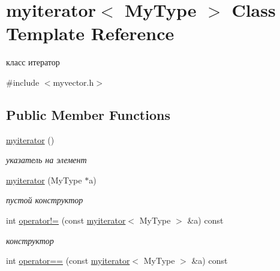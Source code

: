 \hypertarget{classmyiterator}{}\section{myiterator$<$ My\+Type $>$ Class Template Reference}
\label{classmyiterator}


класс итератор  




{\ttfamily \#include $<$myvector.\+h$>$}

\subsection*{Public Member Functions}
\begin{DoxyCompactItemize}
\item 
\hypertarget{classmyiterator_ad6723e5362bafc8d98815f59f75733f2}{}\hyperlink{classmyiterator_ad6723e5362bafc8d98815f59f75733f2}{myiterator} ()\label{classmyiterator_ad6723e5362bafc8d98815f59f75733f2}

\begin{DoxyCompactList}\small\item\em указатель на элемент \end{DoxyCompactList}\item 
\hypertarget{classmyiterator_a3c95cfeb2b52fba44ca58b151ec7a04a}{}\hyperlink{classmyiterator_a3c95cfeb2b52fba44ca58b151ec7a04a}{myiterator} (My\+Type $\ast$a)\label{classmyiterator_a3c95cfeb2b52fba44ca58b151ec7a04a}

\begin{DoxyCompactList}\small\item\em пустой конструктор \end{DoxyCompactList}\item 
\hypertarget{classmyiterator_ad186d61d7e78957928e272fa3e5517b2}{}int \hyperlink{classmyiterator_ad186d61d7e78957928e272fa3e5517b2}{operator!=} (const \hyperlink{classmyiterator}{myiterator}$<$ My\+Type $>$ \&a) const \label{classmyiterator_ad186d61d7e78957928e272fa3e5517b2}

\begin{DoxyCompactList}\small\item\em конструктор \end{DoxyCompactList}\item 
\hypertarget{classmyiterator_aef4452a0ce40b587f65a0f17f3e179cd}{}int \hyperlink{classmyiterator_aef4452a0ce40b587f65a0f17f3e179cd}{operator==} (const \hyperlink{classmyiterator}{myiterator}$<$ My\+Type $>$ \&a) const \label{classmyiterator_aef4452a0ce40b587f65a0f17f3e179cd}


\end{DoxyCompactItemize}

